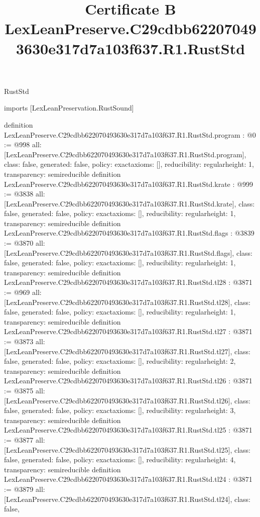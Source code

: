 \begin{lexlean}{RustStd}
\title{Certificate B LexLeanPreserve.C29cdbb622070493630e317d7a103f637.R1.RustStd}
\begin{coremodule}
imports [LexLeanPreservation.RustSound]

definition LexLeanPreserve.C29cdbb622070493630e317d7a103f637.R1.RustStd.program : @0 := @998 {
  all: [LexLeanPreserve.C29cdbb622070493630e317d7a103f637.R1.RustStd.program],
  class: false,
  generated: false,
  policy: exact{axioms: []},
  reducibility: regular{height: 1},
  transparency: semireducible
}
definition LexLeanPreserve.C29cdbb622070493630e317d7a103f637.R1.RustStd.krate : @999 := @3838 {
  all: [LexLeanPreserve.C29cdbb622070493630e317d7a103f637.R1.RustStd.krate],
  class: false,
  generated: false,
  policy: exact{axioms: []},
  reducibility: regular{height: 1},
  transparency: semireducible
}
definition LexLeanPreserve.C29cdbb622070493630e317d7a103f637.R1.RustStd.flags : @3839 := @3870 {
  all: [LexLeanPreserve.C29cdbb622070493630e317d7a103f637.R1.RustStd.flags],
  class: false,
  generated: false,
  policy: exact{axioms: []},
  reducibility: regular{height: 1},
  transparency: semireducible
}
definition LexLeanPreserve.C29cdbb622070493630e317d7a103f637.R1.RustStd.tl28 : @3871 := @969 {
  all: [LexLeanPreserve.C29cdbb622070493630e317d7a103f637.R1.RustStd.tl28],
  class: false,
  generated: false,
  policy: exact{axioms: []},
  reducibility: regular{height: 1},
  transparency: semireducible
}
definition LexLeanPreserve.C29cdbb622070493630e317d7a103f637.R1.RustStd.tl27 : @3871 := @3873 {
  all: [LexLeanPreserve.C29cdbb622070493630e317d7a103f637.R1.RustStd.tl27],
  class: false,
  generated: false,
  policy: exact{axioms: []},
  reducibility: regular{height: 2},
  transparency: semireducible
}
definition LexLeanPreserve.C29cdbb622070493630e317d7a103f637.R1.RustStd.tl26 : @3871 := @3875 {
  all: [LexLeanPreserve.C29cdbb622070493630e317d7a103f637.R1.RustStd.tl26],
  class: false,
  generated: false,
  policy: exact{axioms: []},
  reducibility: regular{height: 3},
  transparency: semireducible
}
definition LexLeanPreserve.C29cdbb622070493630e317d7a103f637.R1.RustStd.tl25 : @3871 := @3877 {
  all: [LexLeanPreserve.C29cdbb622070493630e317d7a103f637.R1.RustStd.tl25],
  class: false,
  generated: false,
  policy: exact{axioms: []},
  reducibility: regular{height: 4},
  transparency: semireducible
}
definition LexLeanPreserve.C29cdbb622070493630e317d7a103f637.R1.RustStd.tl24 : @3871 := @3879 {
  all: [LexLeanPreserve.C29cdbb622070493630e317d7a103f637.R1.RustStd.tl24],
  class: false,
}
\end{coremodule}
\end{lexlean}

